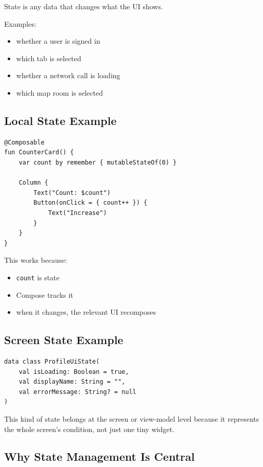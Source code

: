 \documentclass[11pt,a4paper]{article}
\begin{document}
State is any data that changes what the UI shows.

Examples:
\begin{itemize}
    \item whether a user is signed in
    \item which tab is selected
    \item whether a network call is loading
    \item which map room is selected
\end{itemize}

\subsection{Local State Example}

\begin{lstlisting}[style=kazekotlin]
@Composable
fun CounterCard() {
    var count by remember { mutableStateOf(0) }

    Column {
        Text("Count: $count")
        Button(onClick = { count++ }) {
            Text("Increase")
        }
    }
}
\end{lstlisting}

This works because:
\begin{itemize}
    \item \texttt{count} is state
    \item Compose tracks it
    \item when it changes, the relevant UI recomposes
\end{itemize}

\subsection{Screen State Example}

\begin{lstlisting}[style=kazekotlin]
data class ProfileUiState(
    val isLoading: Boolean = true,
    val displayName: String = "",
    val errorMessage: String? = null
)
\end{lstlisting}

This kind of state belongs at the screen or view-model level because it represents the whole screen's condition, not just one tiny widget.

\subsection{Why State Management Is Central}
\end{document}
